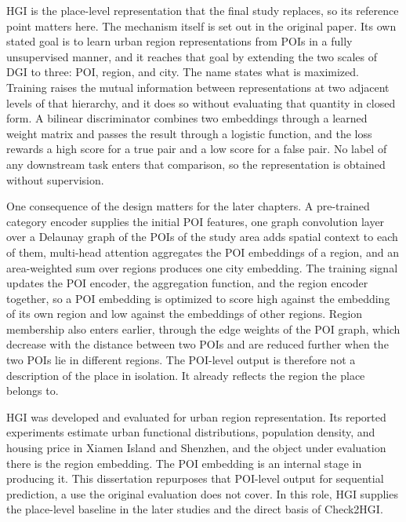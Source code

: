 HGI is the place-level representation that the final study replaces, so its reference
point matters here. The mechanism itself is set out in the original paper. Its own stated goal is to
learn urban region representations from POIs in a fully unsupervised manner, and it
reaches that goal by extending the two scales of DGI to three: POI, region, and city.
The name states what is maximized. Training raises the mutual information between
representations at two adjacent levels of that hierarchy, and it does so without
evaluating that quantity in closed form. A bilinear discriminator combines two
embeddings through a learned weight matrix and passes the result through a logistic
function, and the loss rewards a high score for a true pair and a low score for a
false pair. No label of any downstream task enters that comparison, so the
representation is obtained without supervision.

One consequence of the design matters for the later chapters. A pre-trained category
encoder supplies the initial POI features, one graph convolution layer over a Delaunay
graph of the POIs of the study area adds spatial context to each of them, multi-head
attention aggregates the POI embeddings of a region, and an area-weighted sum over
regions produces one city embedding. The training signal updates the POI encoder, the
aggregation function, and the region encoder together, so a POI embedding is optimized
to score high against the embedding of its own region and low against the embeddings
of other regions. Region membership also enters earlier, through the edge weights of
the POI graph, which decrease with the distance between two POIs and are reduced
further when the two POIs lie in different regions. The POI-level output is therefore
not a description of the place in isolation. It already reflects the region the place
belongs to.

HGI was developed and evaluated for urban region representation. Its reported
experiments estimate urban functional distributions, population density, and housing
price in Xiamen Island and Shenzhen, and the object under evaluation there is the
region embedding. The POI embedding is an internal stage in producing it. This
dissertation repurposes that POI-level output for sequential prediction, a use the
original evaluation does not cover. In this role, HGI supplies the place-level
baseline in the later studies and the direct basis of Check2HGI.

